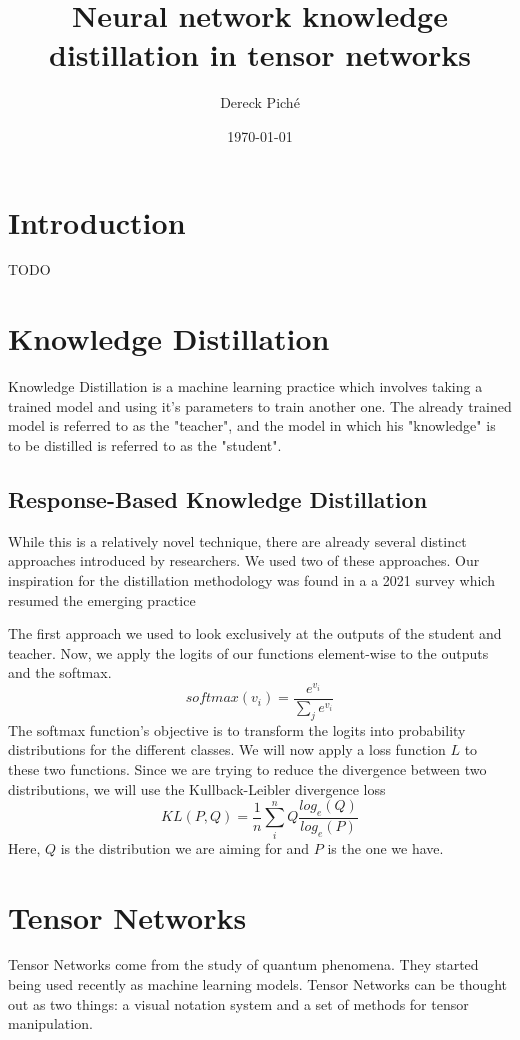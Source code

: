\documentclass[11pt]{article}
\title{Neural network knowledge distillation in tensor networks}
\author{Dereck Piché}
\date{\today}
\begin{document}
\maketitle
\begin{abstract}
\end{abstract}

\section{Introduction}
TODO


\section{Knowledge Distillation}
Knowledge Distillation is a machine learning practice which involves
taking a trained model and using it's parameters to train another one.
The already trained model is referred to as the "teacher", and 
the model in which his "knowledge" is to be distilled is referred to as
the "student".

\subsection{Response-Based Knowledge Distillation}
While this is a relatively novel technique, there are 
already several distinct approaches introduced by researchers.
We used two of these approaches. Our inspiration for the distillation 
methodology was found in a a 2021 survey which resumed the emerging practice \textcite{Gou_2021}


The first approach we used to look exclusively at the outputs
of the student and teacher. Now, we apply the logits
of our functions element-wise to the outputs and the softmax.
\begin{equation}
    softmax(v_i) = \frac{e^{v_i}}{\sum_{j}{e^{v_i}}}
\end{equation}
The softmax function's objective is to transform the logits
into probability distributions for the different classes.
We will now apply a loss function $L$ to these two functions.
Since we are trying to reduce the divergence between 
two distributions, we will use the Kullback-Leibler divergence loss
\begin{equation}
    KL(P, Q) = \frac{1}{n} \sum_i^n Q \frac{log_e(Q)}{log_e(P)}
\end{equation}
Here, $Q$ is the distribution we are aiming for and $P$ is the one we have.



\section{Tensor Networks}
Tensor Networks come from the study of quantum phenomena. They 
started being used recently as machine learning models. Tensor Networks
can be thought out as two things: a visual notation system and a 
set of methods for tensor manipulation. 
\end{document}
